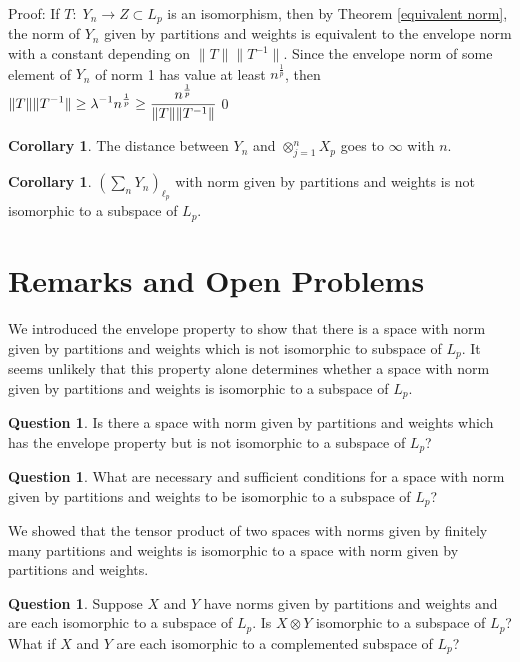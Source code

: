 \documentclass[12pt]{amsart}
\theoremstyle{definition}
\newtheorem{corollary}[theorem]{Corollary}
\newtheorem{question}[theorem]{Question}
\theoremstyle{remark}
\numberwithin{equation}{section}
\begin{document}
Proof: If  $T: \; Y_n \rightarrow Z\subset L_p$ is an isomorphism, then 
 by Theorem \ref{equivalent norm}, the norm of $Y_n$ 
given by partitions and weights is equivalent to the envelope norm
with a constant depending on $\|T\|\|T^{-1}\|$. 
Since the envelope norm of some element of $Y_n$ of norm 1 
has value at least $n^{\frac 1 p}$,
 then $\begin{displaystyle}\|T\|\|T^{-1}\|\geq {\lambda}^{-1}n^{\frac 1 p}
\geq \frac{n^{\frac{1}{p}}}{\|T\|\|T^{-1}\|}\end{displaystyle}$\qed

\begin{corollary} The distance between $Y_n$ and $\otimes_{j=1}^n X_{p}$ 
goes to $\infty$ with $n$. 
\end{corollary}
\begin{corollary}
$(\sum_n Y_n)_{\ell_p}$ with norm given by partitions and weights is not
isomorphic to a subspace of $L_p$.
\end{corollary}
\section{Remarks and Open Problems}

We introduced the envelope property to show that there is a space with
norm given by partitions and weights which is not isomorphic to subspace
of $L_p$. It seems unlikely that this property alone determines whether
a space with
norm given by partitions and weights  is isomorphic to a subspace of $L_p$.

\begin{question} Is there a space with
norm given by partitions and weights  which has the envelope property
but is not isomorphic to a subspace of $L_p$?
\end{question}

\begin{question} What are necessary and sufficient conditions for a space
with
norm given by partitions and weights  to be isomorphic to a subspace of
$L_p$?
\end{question}

We showed that the tensor product of two spaces with norms given by
finitely many partitions and weights is isomorphic to a space with
norm given by partitions and weights.

\begin{question} Suppose $X$ and $Y$ have norms given by partitions and
weights  and are each isomorphic to a subspace of $L_p$. Is $X \otimes Y$
isomorphic to a subspace of $L_p$? What if $X$ and $Y$ are each isomorphic
to a complemented subspace of $L_p$?
\end{question}
\end{document}
